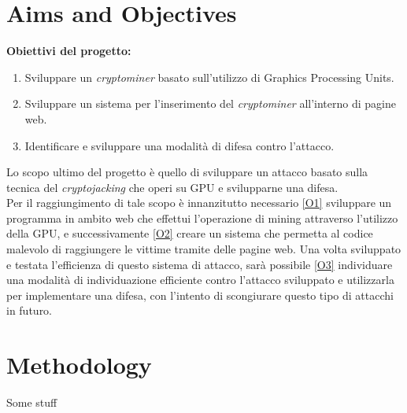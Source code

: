 \documentclass[
11pt, %
oneside, %
english, %
onehalfspacing,%
headsepline, %
]{MastersDoctoralThesis} %
\begin{document}
{\let\clearpage\relax \chapter{Aims and Objectives}}
\textbf{Obiettivi del progetto:}
\begin{enumerate}[label=(\roman*)]
        \item\label{O1} Sviluppare un \emph{cryptominer} basato sull'utilizzo di Graphics Processing Units.
        \item\label{O2} Sviluppare un sistema per l'inserimento del \emph{cryptominer} all'interno di pagine web.
        \item\label{O3} Identificare e sviluppare una modalità di difesa contro l'attacco.
\end{enumerate}
Lo scopo ultimo del progetto è quello di sviluppare un attacco basato sulla tecnica del \emph{cryptojacking} che operi su GPU e svilupparne una difesa.\\
Per il raggiungimento di tale scopo è innanzitutto necessario \ref{O1} sviluppare un programma in ambito web che effettui l'operazione di mining attraverso l'utilizzo della GPU, e successivamente \ref{O2} creare un sistema che permetta al codice malevolo di raggiungere le vittime tramite delle pagine web. Una volta sviluppato e testata l'efficienza di questo sistema di attacco, sarà possibile \ref{O3} individuare una modalità di individuazione efficiente contro l'attacco sviluppato e utilizzarla per implementare una difesa, con l'intento di scongiurare questo tipo di attacchi in futuro.

{\let\clearpage\relax \chapter{Methodology}}
Some stuff


\printbibliography\
\end{document}
